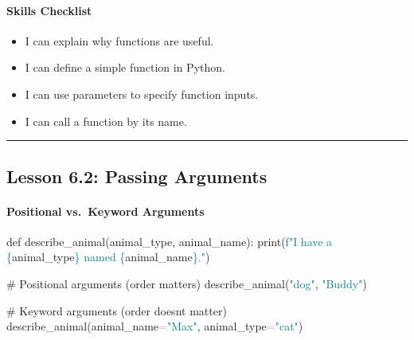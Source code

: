 \documentclass[
  justified,
  openright,
]{tufte-book}
\let\subsubsection\paragraph
\let\paragraph\paragraph
\newcommand{\BuiltInTok}[1]{#1}
\newcommand{\CommentTok}[1]{\textcolor{MidGray}{#1}}
\newcommand{\KeywordTok}[1]{\textcolor{BrandBlue}{#1}}
\newcommand{\NormalTok}[1]{#1}
\newcommand{\OperatorTok}[1]{\textcolor{DarkGray}{#1}}
\newcommand{\SpecialCharTok}[1]{\textcolor{Teal}{#1}}
\newcommand{\SpecialStringTok}[1]{\textcolor{Teal}{#1}}
\newcommand{\StringTok}[1]{\textcolor{Teal}{#1}}
\newenvironment{Shaded}{%
  \begin{snugshade}
}{%
  \end{snugshade}
}
\let\subsubsection\paragraph
\let\paragraph\paragraph
\providecommand{\tightlist}{%
  \setlength{\itemsep}{0pt}\setlength{\parskip}{0pt}}
\begin{document}
\subsubsection{Skills Checklist}\label{skills-checklist-27}

\begin{itemize}
\tightlist
\item[$\square$]
  I can explain why functions are useful.
\item[$\square$]
  I can define a simple function in Python.
\item[$\square$]
  I can use parameters to specify function inputs.
\item[$\square$]
  I can call a function by its name.
\end{itemize}

\begin{center}\rule{0.5\linewidth}{0.5pt}\end{center}

\subsection{Lesson 6.2: Passing
Arguments}\label{lesson-6.2-passing-arguments}

\subsubsection{Positional vs.~Keyword
Arguments}\label{positional-vs.-keyword-arguments}

\begin{Shaded}
\begin{Highlighting}[]
\KeywordTok{def}\NormalTok{ describe\_animal(animal\_type, animal\_name):}
    \BuiltInTok{print}\NormalTok{(}\SpecialStringTok{f"I have a }\SpecialCharTok{\{}\NormalTok{animal\_type}\SpecialCharTok{\}}\SpecialStringTok{ named }\SpecialCharTok{\{}\NormalTok{animal\_name}\SpecialCharTok{\}}\SpecialStringTok{."}\NormalTok{)}

\CommentTok{\# Positional arguments (order matters)}
\NormalTok{describe\_animal(}\StringTok{"dog"}\NormalTok{, }\StringTok{"Buddy"}\NormalTok{)}

\CommentTok{\# Keyword arguments (order doesn\textquotesingle{}t matter)}
\NormalTok{describe\_animal(animal\_name}\OperatorTok{=}\StringTok{"Max"}\NormalTok{, animal\_type}\OperatorTok{=}\StringTok{"cat"}\NormalTok{)}
\end{Highlighting}
\end{Shaded}
\end{document}
